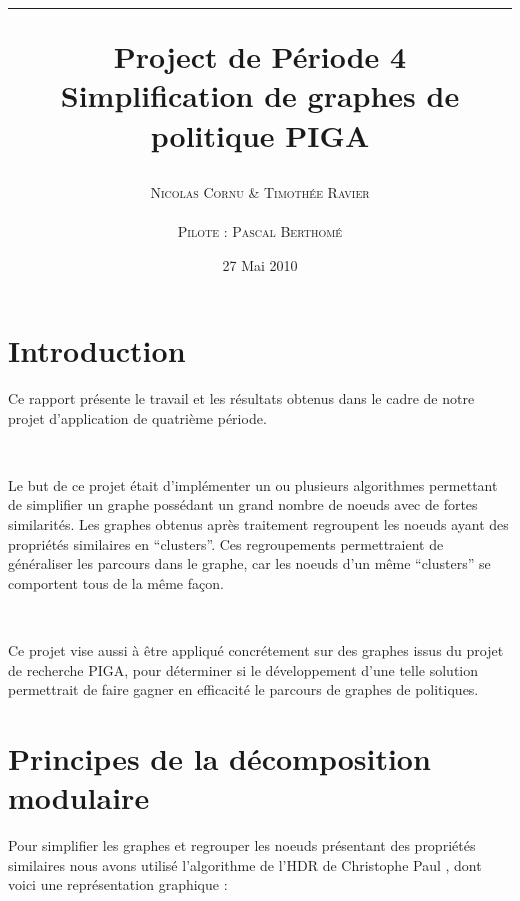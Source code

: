 \documentclass[pdftex,a4paper,titlepage,11pt,openright]{article}
\newcommand{\nom}[1]{\textsc{#1}}
\newcommand{\ligne}[1][1pt]{
  \par\noindent
  \rule[.5ex]{\linewidth}{#1}\par}
\newcommand{\clearemptydoublepage}{
	\newpage{\pagestyle{empty}\cleardoublepage}}
\begin{document}
\setlength{\parskip}{2.4ex}

\title{\ligne{\Large}\textbf{Project de Période 4}\\
\Large Simplification de graphes de politique PIGA}
\author{\nom{Nicolas Cornu} \& \nom{Timothée Ravier}\\\\\nom{Pilote : Pascal Berthomé}}
\date{27 Mai 2010}


\maketitle

\clearemptydoublepage

\setcounter{secnumdepth}{2}
\setcounter{tocdepth}{2}
\tableofcontents
\addtocounter{page}{-1}

\newpage

\section*{Introduction} 
Ce rapport présente le travail et les résultats obtenus dans le cadre de notre projet d'application de quatrième période.

~

Le but de ce projet était d'implémenter un ou plusieurs algorithmes permettant de simplifier un graphe possédant un grand nombre de noeuds avec de fortes similarités. Les graphes obtenus après traitement regroupent les noeuds ayant des propriétés similaires en ``clusters''. Ces regroupements permettraient de généraliser les parcours dans le graphe, car les noeuds d'un même ``clusters'' se comportent tous de la même façon.

~

Ce projet vise aussi à être appliqué concrétement sur des graphes issus du projet de recherche PIGA, pour déterminer si le développement d'une telle solution permettrait de faire gagner en efficacité le parcours de graphes de politiques.

\newpage

\section{Principes de la décomposition modulaire}
Pour simplifier les graphes et regrouper les noeuds présentant des propriétés similaires nous avons utilisé l'algorithme de l'HDR de Christophe Paul \cite{HDR}, dont voici une représentation graphique :
\end{document}
